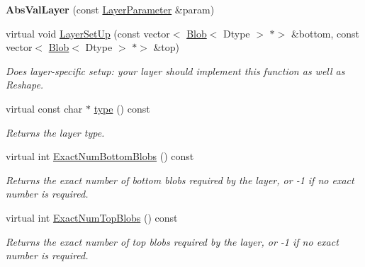 \begin{DoxyCompactItemize}
\mbox{\label{classcaffe_1_1_abs_val_layer_a513c13552694e5860b85986b94793eb0}} 
{\bfseries Abs\+Val\+Layer} (const \mbox{\hyperlink{classcaffe_1_1_layer_parameter}{Layer\+Parameter}} \&param)
\item 
virtual void \mbox{\hyperlink{classcaffe_1_1_abs_val_layer_a5bc321f94f7d13e938e31131fc55487b}{Layer\+Set\+Up}} (const vector$<$ \mbox{\hyperlink{classcaffe_1_1_blob}{Blob}}$<$ Dtype $>$ $\ast$$>$ \&bottom, const vector$<$ \mbox{\hyperlink{classcaffe_1_1_blob}{Blob}}$<$ Dtype $>$ $\ast$$>$ \&top)
\begin{DoxyCompactList}\small\item\em Does layer-\/specific setup\+: your layer should implement this function as well as Reshape. \end{DoxyCompactList}\item 
\mbox{\label{classcaffe_1_1_abs_val_layer_aae782c69f757eacf4cec30131726e29d}} 
virtual const char $\ast$ \mbox{\hyperlink{classcaffe_1_1_abs_val_layer_aae782c69f757eacf4cec30131726e29d}{type}} () const
\begin{DoxyCompactList}\small\item\em Returns the layer type. \end{DoxyCompactList}\item 
virtual int \mbox{\hyperlink{classcaffe_1_1_abs_val_layer_acac806dbc6d3fa3dd7daae00caabd731}{Exact\+Num\+Bottom\+Blobs}} () const
\begin{DoxyCompactList}\small\item\em Returns the exact number of bottom blobs required by the layer, or -\/1 if no exact number is required. \end{DoxyCompactList}\item 
virtual int \mbox{\hyperlink{classcaffe_1_1_abs_val_layer_aaf18bf4b77994475e8b55e5cefaa654a}{Exact\+Num\+Top\+Blobs}} () const
\begin{DoxyCompactList}\small\item\em Returns the exact number of top blobs required by the layer, or -\/1 if no exact number is required. \end{DoxyCompactList}\end{DoxyCompactItemize}
